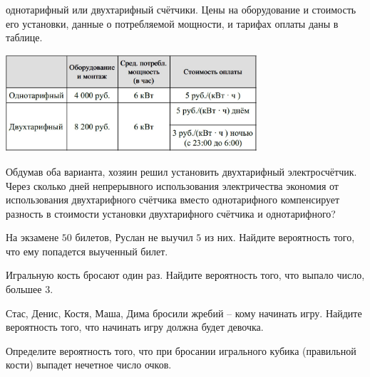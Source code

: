 \begin{homework}[number=1]
\begin{listofex}
		однотарифный или двухтарифный счётчики. Цены на оборудование и стоимость его установки, данные о
		потребляемой мощности, и тарифах оплаты даны в таблице.
	\begin{center}
		\includegraphics[align=t, width=0.7\textwidth]{pics/G91M3H1-2}
	\end{center}
	Обдумав оба варианта, хозяин решил установить двухтарифный электросчётчик. Через сколько дней
	непрерывного использования электричества экономия от использования двухтарифного счётчика вместо
	однотарифного компенсирует разность в стоимости установки двухтарифного счётчика и однотарифного?
	\item На экзамене \( 50 \) билетов, Руслан не выучил \( 5 \) из них. Найдите вероятность того, что ему попадется
	выученный билет.
	\item Игральную кость бросают один раз. Найдите вероятность того, что выпало число, большее \( 3 \).
	\item Стас, Денис, Костя, Маша, Дима бросили жребий -- кому начинать игру. Найдите вероятность того, что
	начинать игру должна будет девочка.
	\item Определите вероятность того, что при бросании игрального кубика (правильной кости) выпадет нечетное
	число очков.
	\item {}
	\end{listofex}
\end{homework}
